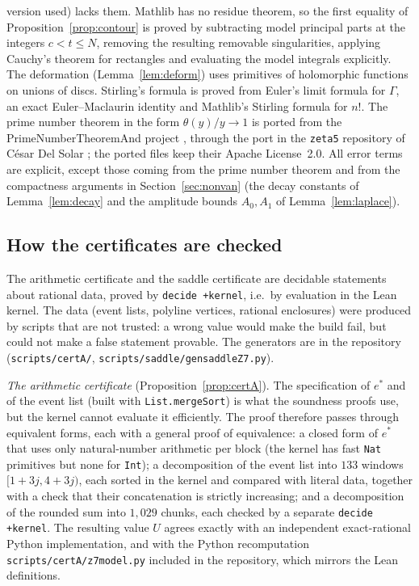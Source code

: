 \documentclass[11pt]{amsart}
\theoremstyle{definition}
\theoremstyle{remark}
\numberwithin{equation}{section}
\newcommand{\lean}[1]{{\def\_{\textunderscore\allowbreak}\texttt{#1}}}
\begin{document}
version used) lacks them. Mathlib has no residue theorem, so the first equality of Proposition~\ref{prop:contour}
is proved by subtracting model principal parts at the integers $c<t\le N$, removing the resulting removable
singularities, applying Cauchy's theorem for rectangles and evaluating the model integrals explicitly. The deformation
(Lemma~\ref{lem:deform}) uses primitives of holomorphic functions on unions of discs. Stirling's formula is proved
from Euler's limit formula for $\Gamma$, an exact Euler--Maclaurin identity and Mathlib's Stirling formula for
$n!$. The prime number theorem in the form $\theta(y)/y\to1$ is ported from the PrimeNumberTheoremAnd project
\cite{PNTplus}, through the port in the \lean{zeta5} repository of C\'esar Del Solar \cite{zeta5}; the ported files
keep their Apache License~2.0. All error terms are explicit, except those coming from the prime number theorem and
from the compactness arguments in Section~\ref{sec:nonvan} (the decay constants of Lemma~\ref{lem:decay} and the
amplitude bounds $A_0,A_1$ of Lemma~\ref{lem:laplace}).

\subsection{How the certificates are checked}\label{sec:lean-cert}
The arithmetic certificate and the saddle certificate are decidable statements about rational data, proved by
\lean{decide +kernel}, i.e.\ by evaluation in the Lean kernel. The data (event lists, polyline vertices, rational
enclosures) were produced by scripts that are not trusted: a wrong value would make the build fail, but could not
make a false statement provable. The generators are in the repository (\lean{scripts\slash{}certA\slash{}},
\lean{scripts\slash{}saddle\slash{}gen\_saddle\_Z7.py}).

\emph{The arithmetic certificate} (Proposition~\ref{prop:certA}). The specification of $e^*$ and of the event list
(built with \lean{List.mergeSort}) is what the soundness proofs use, but the kernel cannot evaluate it efficiently.
The proof therefore passes through equivalent forms, each with a general proof of equivalence: a closed form of $e^*$
that uses only natural-number arithmetic per block (the kernel has fast \lean{Nat} primitives but none for
\lean{Int}); a decomposition of the event list into $133$ windows $[1+3j,4+3j)$, each sorted in the kernel and
compared with literal data, together with a check that their concatenation is strictly increasing; and a
decomposition of the rounded sum into $1{,}029$ chunks, each checked by a separate \lean{decide +kernel}. The resulting
value $U$ agrees exactly with an independent exact-rational Python implementation, and with the Python
recomputation \lean{scripts\slash{}certA\slash{}z7\_model.py} included in the repository, which mirrors the Lean
definitions.
\end{document}
